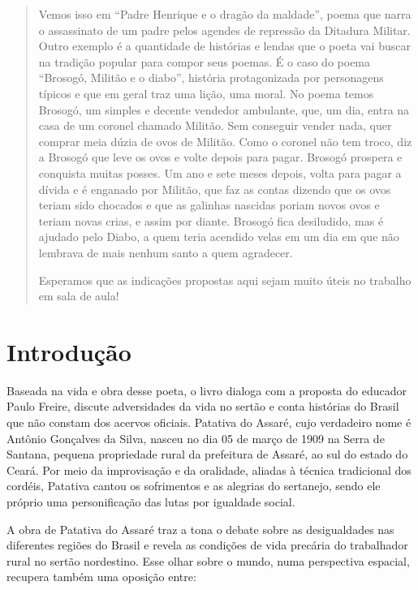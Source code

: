 \documentclass[12pt]{extarticle}
\begin{document}
\begin{abstract}
Vemos isso em ``Padre Henrique e o dragão da maldade'', poema que narra o assassinato 
de um padre pelos agendes de repressão da Ditadura Militar. Outro exemplo é a 
quantidade de histórias e lendas que o poeta vai buscar na tradição popular 
para compor seus poemas. É o caso do poema ``Brosogó, Militão e o diabo'', história 
protagonizada por personagens típicos e que em geral traz uma lição, uma moral. 
No poema temos Brosogó, um simples e decente vendedor ambulante, que, um dia, entra 
na casa de um coronel chamado Militão. Sem conseguir vender nada, quer comprar meia 
dúzia de ovos de Militão. Como o coronel não tem troco, diz a Brosogó que leve os ovos 
e volte depois para pagar. Brosogó prospera e conquista muitas posses. Um ano e 
sete meses depois, volta para pagar a dívida e é enganado por Militão, que faz as 
contas dizendo que os ovos teriam sido chocados e que as galinhas nascidas poriam 
novos ovos e teriam novas crias, e assim por diante. Brosogó fica desiludido, mas 
é ajudado pelo Diabo, a quem teria acendido velas em um dia em que não lembrava de 
mais nenhum santo a quem agradecer.

Esperamos que as indicações propostas aqui sejam muito úteis no trabalho em
sala de aula!



\end{abstract}

\tableofcontents


\section{Introdução}

Baseada na vida e obra desse poeta, o livro dialoga com a proposta do educador Paulo Freire, 
discute adversidades da vida no sertão e conta histórias do Brasil que não constam dos acervos 
oficiais. Patativa do Assaré, cujo verdadeiro nome é Antônio Gonçalves da Silva, nasceu no dia 
05 de março de 1909 na Serra de Santana, pequena propriedade rural da prefeitura de Assaré, ao 
sul do estado do Ceará. Por meio da improvisação e da oralidade, aliadas à técnica tradicional 
dos cordéis, Patativa cantou os sofrimentos e as alegrias do sertanejo, sendo ele próprio uma 
personificação das lutas por igualdade social.

A obra de Patativa do Assaré traz a tona o debate sobre as desigualdades nas diferentes regiões 
do Brasil e revela as condições de vida precária do trabalhador rural no sertão nordestino. Esse 
olhar sobre o mundo, numa perspectiva espacial, recupera também uma oposição entre:
\end{document}
